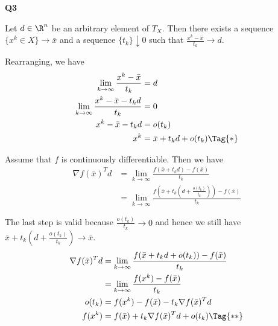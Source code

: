\def\TC{T_X(\bar x)}
\def\LC{L_X(\bar x)}
\def\lk{\lim_{k\to\infty}}
\def\nf{\nabla f}
\def\n{\nabla}
\def\f{\frac}
\def\bx{\bar x}

{\large\textbf{Q3}}

%
%
%
%
%
%

Let $d\in\R^n$ be an arbitrary element of $T_X$. Then there exists a
sequence $\{x^k\in X\}\to\bar x$ and a sequence $\{t_k\}\downarrow0$
such that $\frac{x^k-\bar x}{t_k}\to d$.

Rearranging, we have
\begin{align*}
	\lim_{k\to\infty}\frac{x^k-\bar x}{t_k}      & =d                              \\
	\lim_{k\to\infty}\frac{x^k-\bar x-t_kd}{t_k} & =0                              \\
	x^k-\bar x-t_kd                              & = o(t_k)                        \\
	x^k                                          & = \bar x + t_kd + o(t_k)\Tag{*}
\end{align*}

Assume that $f$ is continuously differentiable. Then we have
\begin{align*}
	\nf(\bx)^Td
	 & = \lk\f{f(\bx+t_kd)-f(\bx)}{t_k}                   \\
	 & = \lk\f{f(\bx+t_k(d+\f{o(t_k)}{t_k}))-f(\bx)}{t_k}
\end{align*}

The last step is valid because $\f{o(t_k)}{t_k}\to0$ and hence we
still have $\bx+t_k\left(d+\f{o(t_k)}{t_k}\right)\to\bar x$.
\begin{align*}
	\nf(\bx)^Td
	       & =\lk\f{f(\bx+t_kd+o(t_k))-f(\bx)}{t_k} \\
	       & =\lk\f{f(x^k)-f(\bx)}{t_k}             \\
	o(t_k) & =f(x^k)-f(\bx)-t_k\nf(\bx)^Td          \\
	f(x^k) & =f(\bx)+t_k\nf(\bx)^Td+o(t_k)\Tag{**}
\end{align*}

